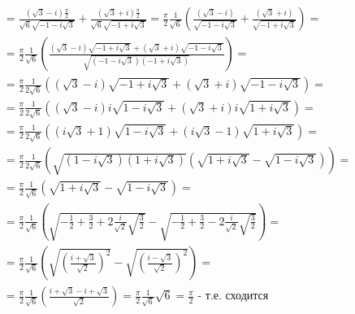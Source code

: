 \documentclass[a4paper, 12pt]{article}
\begin{document}
    \begin{align*}
     &= \frac{\left(\sqrt{3}-i\right)\frac{\pi}{2}}{\sqrt{6}\sqrt{-1-i\sqrt{3}}} +
     \frac{\left(\sqrt{3}+i\right)\frac{\pi}{2}}{\sqrt{6}\sqrt{-1+i\sqrt{3}}} = 
     \frac{\pi}{2}\frac{1}{\sqrt{6}}\left(
     \frac{\left(\sqrt{3}-i\right)}{\sqrt{-1-i\sqrt{3}}} +
     \frac{\left(\sqrt{3}+i\right)}{\sqrt{-1+i\sqrt{3}}}\right) = \\
     &= \frac{\pi}{2}\frac{1}{\sqrt{6}}\left(
     \frac{\left(\sqrt{3}-i\right)\sqrt{-1+i\sqrt{3}}+\left(\sqrt{3}+i\right)\sqrt{-1-i\sqrt{3}}}{\sqrt{\left(-1-i\sqrt{3}\right)\left(-1+i\sqrt{3}\right)}}\right) = \\
     &= \frac{\pi}{2}\frac{1}{2\sqrt{6}}\left(
     \left(\sqrt{3}-i\right)\sqrt{-1+i\sqrt{3}}+\left(\sqrt{3}+i\right)\sqrt{-1-i\sqrt{3}}\right) = \\
     &= \frac{\pi}{2}\frac{1}{2\sqrt{6}}\left(
     \left(\sqrt{3}-i\right)i\sqrt{1-i\sqrt{3}}+\left(\sqrt{3}+i\right)i\sqrt{1+i\sqrt{3}}
     \right) = \\
     &= \frac{\pi}{2}\frac{1}{2\sqrt{6}}\left(
     \left(i\sqrt{3}+1\right)\sqrt{1-i\sqrt{3}}+\left(i\sqrt{3}-1\right)\sqrt{1+i\sqrt{3}}
     \right) = \\
     &= \frac{\pi}{2}\frac{1}{2\sqrt{6}}\left(
     \sqrt{\left(1-i\sqrt{3}\right)\left(1+i\sqrt{3}\right)}\left(
     \sqrt{1+i\sqrt{3}}-\sqrt{1-i\sqrt{3}}
     \right)
     \right) = \\
     &= \frac{\pi}{2}\frac{1}{\sqrt{6}}\left(     
     \sqrt{1+i\sqrt{3}}-\sqrt{1-i\sqrt{3}}\right) = \\
     &= \frac{\pi}{2}\frac{1}{\sqrt{6}}\left(     
     \sqrt{-\frac{1}{2}+\frac{3}{2}+2\frac{i}{\sqrt{2}}\sqrt{\frac{3}{2}}}-
     \sqrt{-\frac{1}{2}+\frac{3}{2}-2\frac{i}{\sqrt{2}}\sqrt{\frac{3}{2}}}
     \right) = \\
     &= \frac{\pi}{2}\frac{1}{\sqrt{6}}\left(     
     \sqrt{\left(\frac{i+\sqrt{3}}{\sqrt{2}}\right)^2}-
     \sqrt{\left(\frac{i-\sqrt{3}}{\sqrt{2}}\right)^2}
     \right) = \\
     &= \frac{\pi}{2}\frac{1}{\sqrt{6}}\left(     
     \frac{i+\sqrt{3}-i+\sqrt{3}}{\sqrt{2}}
     \right) = \frac{\pi}{2}\frac{1}{\sqrt{6}}\sqrt{6} = \frac{\pi}{2} \text{ - т.е. сходится}
    \end{align*}
\end{document}
